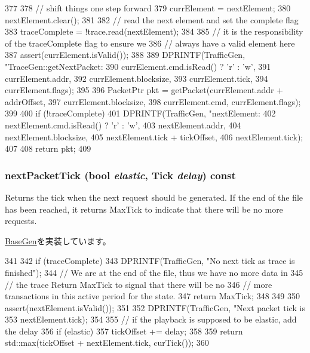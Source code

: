 \begin{DoxyCode}
377 {
378     // shift things one step forward
379     currElement = nextElement;
380     nextElement.clear();
381 
382     // read the next element and set the complete flag
383     traceComplete = !trace.read(nextElement);
384 
385     // it is the responsibility of the traceComplete flag to ensure we
386     // always have a valid element here
387     assert(currElement.isValid());
388 
389     DPRINTF(TrafficGen, "TraceGen::getNextPacket: %
390             currElement.cmd.isRead() ? 'r' : 'w',
391             currElement.addr,
392             currElement.blocksize,
393             currElement.tick,
394             currElement.flags);
395 
396     PacketPtr pkt = getPacket(currElement.addr + addrOffset,
397                               currElement.blocksize,
398                               currElement.cmd, currElement.flags);
399 
400     if (!traceComplete)
401         DPRINTF(TrafficGen, "nextElement: %
402                 nextElement.cmd.isRead() ? 'r' : 'w',
403                 nextElement.addr,
404                 nextElement.blocksize,
405                 nextElement.tick + tickOffset,
406                 nextElement.tick);
407 
408     return pkt;
409 }
\end{DoxyCode}
\hypertarget{classTraceGen_a65f805b54c24ac3ce0a37716de3e8abc}{
\subsubsection[{nextPacketTick}]{ nextPacketTick (bool {\em elastic}, \/  {\bf Tick} {\em delay}) const}}
\label{classTraceGen_a65f805b54c24ac3ce0a37716de3e8abc}
Returns the tick when the next request should be generated. If the end of the file has been reached, it returns MaxTick to indicate that there will be no more requests. 

\hyperlink{classBaseGen_abee7e4d35054bbc37e9332bbd17f4a69}{BaseGen}を実装しています。


\begin{DoxyCode}
341 {
342     if (traceComplete) {
343         DPRINTF(TrafficGen, "No next tick as trace is finished\n");
344         // We are at the end of the file, thus we have no more data in
345         // the trace Return MaxTick to signal that there will be no
346         // more transactions in this active period for the state.
347         return MaxTick;
348     }
349 
350     assert(nextElement.isValid());
351 
352     DPRINTF(TrafficGen, "Next packet tick is %
353             nextElement.tick);
354 
355     // if the playback is supposed to be elastic, add the delay
356     if (elastic)
357         tickOffset += delay;
358 
359     return std::max(tickOffset + nextElement.tick, curTick());
360 }
\end{DoxyCode}


